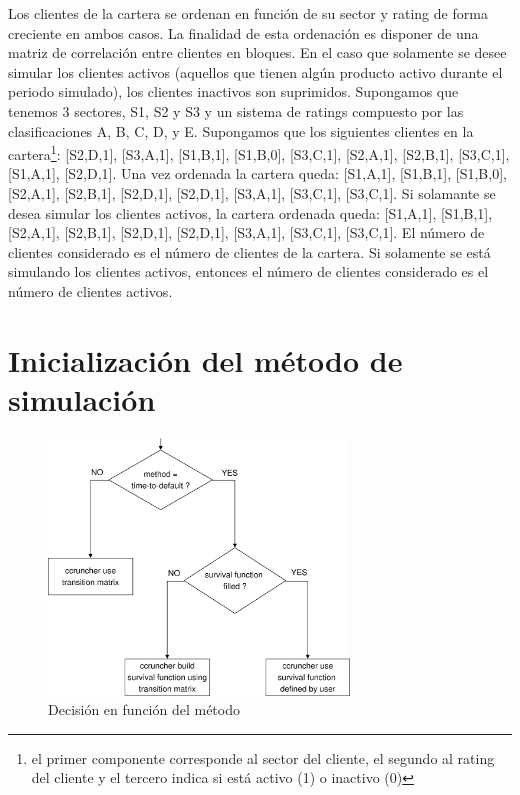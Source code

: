 Los clientes de la cartera se ordenan en funci\'on de su sector
y rating de forma creciente en ambos casos. La finalidad de esta
ordenaci\'on es disponer de una matriz de correlaci\'on entre
clientes en bloques. En el caso que solamente se desee simular
los clientes activos (aquellos que tienen alg\'un producto activo
durante el periodo simulado), los clientes inactivos son
suprimidos.
\newline
\newline
Supongamos que tenemos 3 sectores, S1, S2 y S3 y un sistema de
ratings compuesto por las clasificaciones A, B, C, D, y E.
Supongamos que los siguientes clientes en la cartera\footnote{el
primer componente corresponde al sector del cliente, el segundo al
rating del cliente y el tercero indica si est\'a activo (1) o inactivo (0)}:
[S2,D,1], [S3,A,1], [S1,B,1], [S1,B,0], [S3,C,1], [S2,A,1], [S2,B,1], [S3,C,1],
[S1,A,1], [S2,D,1].
\newline
\newline
Una vez ordenada la cartera queda:
[S1,A,1], [S1,B,1], [S1,B,0], [S2,A,1], [S2,B,1], [S2,D,1], [S2,D,1],
[S3,A,1], [S3,C,1], [S3,C,1].
\newline
\newline
Si solamante se desea simular los clientes activos, la cartera ordenada queda:
[S1,A,1], [S1,B,1], [S2,A,1], [S2,B,1], [S2,D,1], [S2,D,1], [S3,A,1],
[S3,C,1], [S3,C,1].
\newline
\newline
El n\'umero de clientes considerado es el n\'umero de clientes de la cartera.
Si solamente se est\'a simulando los clientes activos, entonces el n\'umero
de clientes considerado es el n\'umero de clientes activos.


\section{Inicializaci\'on del m\'etodo de simulaci\'on}

\begin{figure}[!hb]
\begin{center}
\includegraphics[width=8cm,angle=0]{./images/decisiontree1.eps}
\caption{Decisi\'on en funci\'on del m\'etodo}
\label{decisiontree1}
\end{center}
\end{figure}

